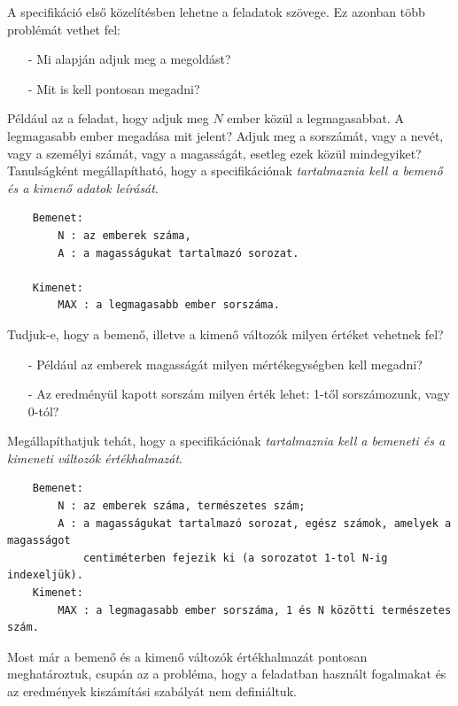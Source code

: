 \documentclass[12pt,margin=0px]{article}
\begin{document}
	\noindent A specifikáció első közelítésben lehetne a feladatok szövege. Ez azonban több problémát vethet fel:
	
	\begin{itemize}
		\item[-] Mi alapján adjuk meg a megoldást?
		\item[-] Mit is kell pontosan megadni?
	\end{itemize}
	
    \noindent Például az a feladat, hogy adjuk meg $N$ ember közül a legmagasabbat. A legmagasabb ember megadása mit jelent? Adjuk meg a sorszámát, vagy a nevét, vagy a személyi számát, vagy a magasságát, esetleg ezek közül mindegyiket? Tanulságként megállapítható, hogy a specifikációnak \emph{tartalmaznia kell a bemenő és a kimenő adatok leírását}.
	
	\begin{verbatim}
	Bemenet:
	    N : az emberek száma,
	    A : a magasságukat tartalmazó sorozat.
	
	Kimenet:
	    MAX : a legmagasabb ember sorszáma.
	\end{verbatim}
	
	\noindent Tudjuk-e, hogy a bemenő, illetve a kimenő változók milyen értéket vehetnek fel?
    \begin{itemize}
        \item[-] Például az emberek magasságát milyen mértékegységben kell megadni?
        \item[-] Az eredményül kapott sorszám milyen érték lehet: 1-től sorszámozunk, vagy 0-tól?
    \end{itemize}

    \noindent Megállapíthatjuk tehát, hogy a specifikációnak \emph{tartalmaznia kell a bemeneti és a kimeneti változók értékhalmazát}.
	
    \begin{verbatim}
	Bemenet:
	    N : az emberek száma, természetes szám;
	    A : a magasságukat tartalmazó sorozat, egész számok, amelyek a magasságot
	        centiméterben fejezik ki (a sorozatot 1-tol N-ig indexeljük).
	Kimenet:
	    MAX : a legmagasabb ember sorszáma, 1 és N közötti természetes szám.
	\end{verbatim}
	
    \noindent Most már a bemenő és a kimenő változók értékhalmazát pontosan meghatároztuk, csupán az a probléma, hogy a feladatban használt fogalmakat és az eredmények kiszámítási szabályát nem definiáltuk.\\
\end{document}

